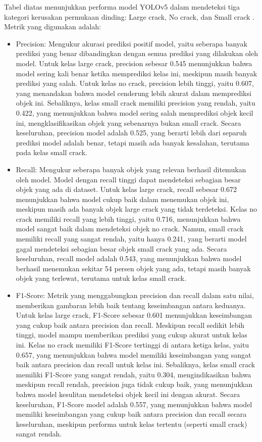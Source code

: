 \documentclass[12pt,a4paper]{article}
\begin{document}
\begin{adjustwidth}{3em}{0pt} 
Tabel diatas menunjukkan performa model YOLOv5 dalam mendeteksi tiga kategori kerusakan permukaan dinding: Large crack, No crack, dan Small crack . Metrik yang digunakan adalah:

\begin{itemize}
    \item Precision: Mengukur akurasi prediksi positif model, yaitu seberapa banyak prediksi yang benar dibandingkan dengan semua prediksi yang dilakukan oleh model. Untuk kelas large crack, precision sebesar 0.545 menunjukkan bahwa model sering kali benar ketika memprediksi kelas ini, meskipun masih banyak prediksi yang salah. Untuk kelas no crack, precision lebih tinggi, yaitu 0.607, yang menandakan bahwa model cenderung lebih akurat dalam memprediksi objek ini. Sebaliknya, kelas small crack memiliki precision yang rendah, yaitu 0.422, yang menunjukkan bahwa model sering salah memprediksi objek kecil ini, mengklasifikasikan objek yang sebenarnya bukan small crack. Secara keseluruhan, precision model adalah 0.525, yang berarti lebih dari separuh prediksi model adalah benar, tetapi masih ada banyak kesalahan, terutama pada kelas small crack.
    
    \item Recall: Mengukur seberapa banyak objek yang relevan berhasil ditemukan oleh model. Model dengan recall tinggi dapat mendeteksi sebagian besar objek yang ada di dataset. Untuk kelas large crack, recall sebesar 0.672 menunjukkan bahwa model cukup baik dalam menemukan objek ini, meskipun masih ada banyak objek large crack yang tidak terdeteksi. Kelas no crack memiliki recall yang lebih tinggi, yaitu 0.716, menunjukkan bahwa model sangat baik dalam mendeteksi objek no crack. Namun, small crack memiliki recall yang sangat rendah, yaitu hanya 0.241, yang berarti model gagal mendeteksi sebagian besar objek small crack yang ada. Secara keseluruhan, recall model adalah 0.543, yang menunjukkan bahwa model berhasil menemukan sekitar 54 persen objek yang ada, tetapi masih banyak objek yang terlewat, terutama untuk kelas small crack.
    
    \item F1-Score: Metrik yang menggabungkan precision dan recall dalam satu nilai, memberikan gambaran lebih baik tentang keseimbangan antara keduanya. Untuk kelas large crack, F1-Score sebesar 0.601 menunjukkan keseimbangan yang cukup baik antara precision dan recall. Meskipun recall sedikit lebih tinggi, model mampu memberikan prediksi yang cukup akurat untuk kelas ini. Kelas no crack memiliki F1-Score tertinggi di antara ketiga kelas, yaitu 0.657, yang menunjukkan bahwa model memiliki keseimbangan yang sangat baik antara precision dan recall untuk kelas ini. Sebaliknya, kelas small crack memiliki F1-Score yang sangat rendah, yaitu 0.304, mengindikasikan bahwa meskipun recall rendah, precision juga tidak cukup baik, yang menunjukkan bahwa model kesulitan mendeteksi objek kecil ini dengan akurat. Secara keseluruhan, F1-Score model adalah 0.557, yang menunjukkan bahwa model memiliki keseimbangan yang cukup baik antara precision dan recall secara keseluruhan, meskipun performa untuk kelas tertentu (seperti small crack) sangat rendah.
    

\end{itemize}
\end{adjustwidth}
\end{document}

